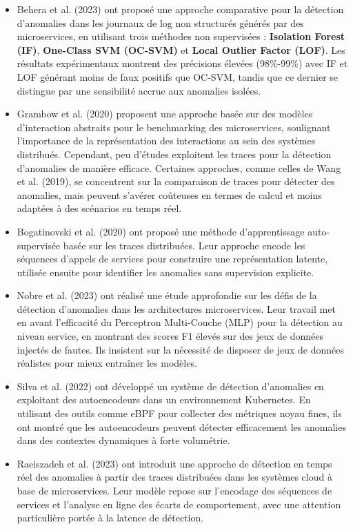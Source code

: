 \documentclass[conference]{IEEEtran}
\begin{document}
\begin{itemize}
\item Behera et al. \cite{behera2023_model_of_anomalie} (2023) ont proposé une approche comparative pour la détection d'anomalies dans les journaux de log non structurés générés par des microservices, en utilisant trois méthodes non supervisées : \textbf{Isolation Forest (IF)}, \textbf{One-Class SVM (OC-SVM)} et \textbf{Local Outlier Factor (LOF)}. Les résultats expérimentaux montrent des précisions élevées (98\%-99\%) avec IF et LOF générant moins de faux positifs que OC-SVM, tandis que ce dernier se distingue par une sensibilité accrue aux anomalies isolées.
\item Grambow et al. \cite{grambow2020} (2020) proposent une approche basée sur des modèles d'interaction abstraits pour le benchmarking des microservices, soulignant l'importance de la représentation des interactions au sein des systèmes distribués. Cependant, peu d'études exploitent les traces pour la détection d'anomalies de manière efficace. Certaines approches, comme celles de Wang et al. (2019), se concentrent sur la comparaison de traces pour détecter des anomalies, mais peuvent s'avérer coûteuses en termes de calcul et moins adaptées à des scénarios en temps réel.

\item Bogatinovski et al. \cite{bogatinovski2020} (2020) ont proposé une méthode d’apprentissage auto-supervisée basée sur les traces distribuées. Leur approche encode les séquences d’appels de services pour construire une représentation latente, utilisée ensuite pour identifier les anomalies sans supervision explicite.

\item Nobre et al. \cite{nobre2023} (2023) ont réalisé une étude approfondie sur les défis de la détection d’anomalies dans les architectures microservices. Leur travail met en avant l’efficacité du Perceptron Multi-Couche (MLP) pour la détection au niveau service, en montrant des scores F1 élevés sur des jeux de données injectés de fautes. Ils insistent sur la nécessité de disposer de jeux de données réalistes pour mieux entraîner les modèles.

\item Silva et al. \cite{silva2022_auto_encodeur} (2022) ont développé un système de détection d’anomalies en exploitant des autoencodeurs dans un environnement Kubernetes. En utilisant des outils comme eBPF pour collecter des métriques noyau fines, ils ont montré que les autoencodeurs peuvent détecter efficacement les anomalies dans des contextes dynamiques à forte volumétrie.

\item Raeiszadeh et al. \cite{Raeiszadeh2023} (2023) ont introduit une approche de détection en temps réel des anomalies à partir des traces distribuées dans les systèmes cloud à base de microservices. Leur modèle repose sur l’encodage des séquences de services et l’analyse en ligne des écarts de comportement, avec une attention particulière portée à la latence de détection.

\end{itemize}
\end{document}
